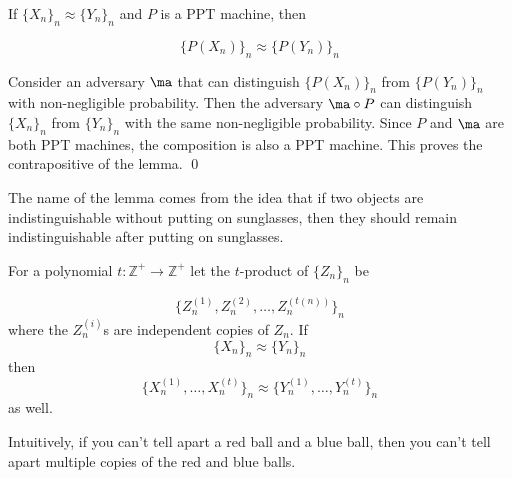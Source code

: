\begin{lemma}
If $\{X_n\}_n\approx\{Y_n\}_n$ and $P$ is a PPT machine, then

$$\{P(X_n)\}_n\approx \{P(Y_n)\}_n$$
\end{lemma}

\proof
Consider an adversary $\ma$ that can distinguish $\{P(X_n)\}_n$ from $\{P(Y_n)\}_n$ with non-negligible probability. Then the adversary $\ma\circ P$ can distinguish $\{X_n\}_n$ from $\{Y_n\}_n$ with the same non-negligible probability. Since $P$ and $\ma$ are both PPT machines, the composition is also a PPT machine. This proves the contrapositive of the lemma.
\qed

The name of the lemma comes from the idea that if two objects are indistinguishable without putting on sunglasses, then they should remain indistinguishable after putting on sunglasses.

\begin{lemma}
For a polynomial $t:\mathbb{Z}^+\rightarrow\mathbb{Z}^+$ let the $t$-product of $\{Z_n\}_n$ be

$$\{Z_n^{(1)}, Z_n^{(2)},\hdots, Z_n^{(t(n))}\}_n$$
where the $Z_n^{(i)}$s are independent copies of $Z_n$. If
$$\{X_n\}_n\approx\{Y_n\}_n$$
then
$$\{X_n^{(1)},\hdots,X_n^{(t)}\}_n\approx\{Y_n^{(1)},\hdots,Y_n^{(t)}\}_n$$
as well.
\end{lemma}
Intuitively, if you can't tell apart a red ball and a blue ball, then you can't tell apart multiple copies of the red and blue balls.

